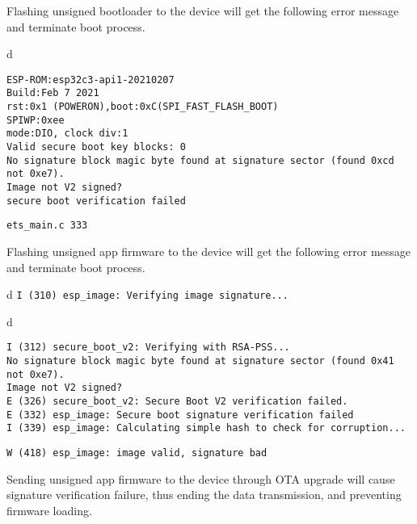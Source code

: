 \documentclass[a4paper,12pt]{book}
\begin{document}
Flashing unsigned bootloader to the device will get the following error message and terminate boot process.

\begin{codebloc}
\begin{tabular}{d}
\vspace{2pt}
\begin{verbatim}
ESP-ROM:esp32c3-api1-20210207
Build:Feb 7 2021
rst:0x1 (POWERON),boot:0xC(SPI_FAST_FLASH_BOOT)
SPIWP:0xee
mode:DIO, clock div:1
Valid secure boot key blocks: 0
No signature block magic byte found at signature sector (found 0xcd not 0xe7). 
Image not V2 signed?
secure boot verification failed
\end{verbatim}
\verb|ets_main.c 333|
\end{tabular}
\end{codebloc}

Flashing unsigned app firmware to the device will get the following error message and terminate boot process.

\begin{codebloc}
\begin{tabular}{d}
\verb|I (310) esp_image: Verifying image signature...|
\end{tabular}
\end{codebloc}

\begin{codebloc}
\begin{tabular}{d}
\vspace{2pt}
\begin{verbatim}
I (312) secure_boot_v2: Verifying with RSA-PSS...
No signature block magic byte found at signature sector (found 0x41 not 0xe7). 
Image not V2 signed?
E (326) secure_boot_v2: Secure Boot V2 verification failed.
E (332) esp_image: Secure boot signature verification failed
I (339) esp_image: Calculating simple hash to check for corruption...
\end{verbatim}
\verb|W (418) esp_image: image valid, signature bad|
\end{tabular}
\end{codebloc}

Sending unsigned app firmware to the device through OTA upgrade will cause signature verification failure, thus ending the data transmission, and preventing firmware loading.
\end{document}
